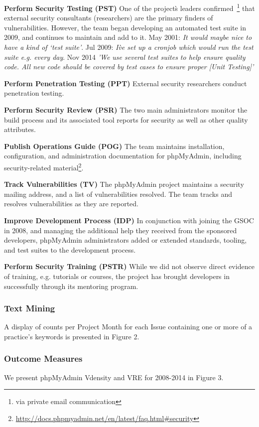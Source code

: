 \textbf{Perform Security Testing (PST)}
One of the project\`s leaders confirmed~\footnote{via private email communication} that external security consultants (researchers) are the primary finders of vulnerabilities. However, the team began developing an automated test suite in 2009, and continues to maintain and add to it. May 2001:  \textit{It would maybe nice to have a kind of `test suite'}. Jul 2009: \textit{I\`ve set up a cronjob which would run the test suite e.g. every day}. Nov 2014 \textit{'We use several test suites to help ensure quality code. All new code should be covered by test cases to ensure proper [Unit Testing]'}

\textbf{Perform Penetration Testing (PPT)}
External security researchers conduct penetration testing. 

\textbf{Perform Security Review (PSR)}
The two main administrators monitor the build process and its associated tool reports for security as well as other quality attributes.

\textbf{Publish Operations Guide (POG)}
The team maintains installation, configuration, and administration documentation for phpMyAdmin, including security-related material\footnote{\url{http://docs.phpmyadmin.net/en/latest/faq.html#security}}. 

\textbf{Track Vulnerabilities (TV)}
The phpMyAdmin project maintains a security mailing address, and a list of vulnerabilities resolved. The team tracks and resolves vulnerabilities as they are reported.

\textbf{Improve Development Process (IDP)} In conjunction with joining the GSOC in 2008, and managing the additional help they received from the sponsored developers, phpMyAdmin administrators added or extended standards, tooling, and test suites to the development process.

\textbf{Perform Security Training (PSTR)} 
While we did not observe direct evidence of training, e.g. tutorials or courses, the project has brought developers in successfully through its mentoring program. 

\subsubsection{Text Mining}
A display of counts per Project Month for each Issue containing one or more of a practice’s keywords is presented in Figure 2.



\subsubsection{Outcome Measures}
We present phpMyAdmin Vdensity and VRE for 2008-2014 in Figure 3.  


